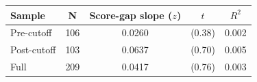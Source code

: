\begin{tabular}{lcccc}
\toprule
Sample & N & Score-gap slope ($z$) & $t$ & $R^2$ \\
\midrule
Pre-cutoff & 106 & 0.0260 & (0.38) & 0.002 \\
Post-cutoff & 103 & 0.0637 & (0.70) & 0.005 \\
Full & 209 & 0.0417 & (0.76) & 0.003 \\
\bottomrule
\end{tabular}